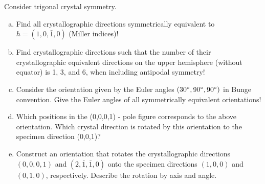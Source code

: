 \begin{frame}

  \begin{Exercise}
    Consider trigonal crystal symmetry.

  \begin{enumerate}[a)]
    \item Find all crystallographic directions symmetrically equivalent to $h
      = (1, 0, \bar 1, 0)$ (Miller indices)!
    \item Find crystallographic directions such that the number of their
      crystallographic equivalent directions on the upper hemisphere (without
      equator) is 1, 3, and 6, when including antipodal symmetry!
    \item Consider the orientation given by the Euler angles $(30^\circ,
      90^\circ, 90^\circ)$ in Bunge convention. Give the Euler angles of
      all symmetrically equivalent orientations!
    \item Which positions in the (0,0,0,1) - pole figure corresponds to the
      above orientation. Which crystal direction is rotated by this
      orientation to the specimen direction (0,0,1)?
    \item Construct an orientation that rotates the crystallographic
      directions $(0,0,0,1)$ and $(2,\bar 1,\bar 1,0)$ onto the specimen
      directions $(1,0,0)$ and $(0,1,0)$, respectively. Describe the rotation
      by axis and angle.
    \end{enumerate}

  \end{Exercise}

\end{frame}

